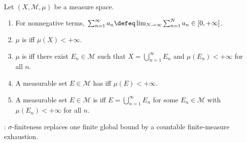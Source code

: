 \begin{definition} \label{def:abstract-measures-finite-sigma-finite} \\
Let $(X,\mathcal{M},\mu)$ be a measure space.
\begin{enumerate}[label=(\roman*)]
\setlength{\itemsep}{0pt}
\item For nonnegative terms, $\sum_{n=1}^{\infty}a_n\defeq\lim_{N\to\infty}\sum_{n=1}^{N}a_n\in[0,+\infty]$.
\item $\mu$ is  iff $\mu(X)<+\infty$.
\item $\mu$ is  iff there exist $E_n\in\mathcal{M}$ such that $X=\bigcup_{n=1}^{\infty}E_n$ and $\mu(E_n)<+\infty$ for all $n$.
\item A measurable set $E\in\mathcal{M}$ has  iff $\mu(E)<+\infty$.
\item A measurable set $E\in\mathcal{M}$ is  iff $E=\bigcup_{n=1}^{\infty}E_n$ for some $E_n\in\mathcal{M}$ with $\mu(E_n)<+\infty$ for all $n$.
\end{enumerate}
: $\sigma$-finiteness replaces one finite global bound by a countable finite-measure exhaustion.
\end{definition}

